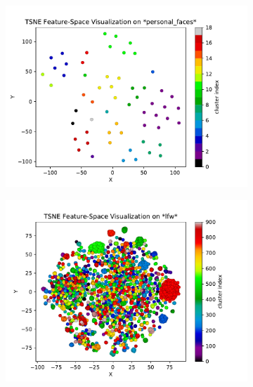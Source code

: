 \documentclass[conference]{IEEEtran}
\begin{document}
\begin{figure}[h]
  \begin{subfigure}[b]{0.5\textwidth}
    \includegraphics[width=\linewidth]{tsne_view_personal_faces}
    \caption{}
  \end{subfigure}
  \begin{subfigure}[b]{0.5\textwidth}
    \includegraphics[width=\linewidth]{tsne_view_lfw}
    \caption{}
  \end{subfigure}
  \begin{subfigure}[b]{0.5\textwidth}

\end{subfigure}
\end{figure}
\end{document}
